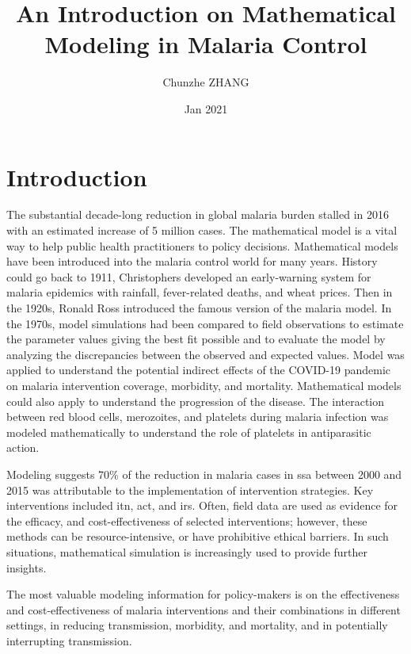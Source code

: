 \documentclass[a4paper, 12pt, twoside]{article}
\title{An Introduction on Mathematical Modeling in Malaria Control}
\author{Chunzhe ZHANG}
\date{Jan 2021}
\begin{document}
\begin{titlepage}
	\maketitle
\end{titlepage}

\tableofcontents

\section{Introduction}
The substantial decade-long reduction in global malaria burden stalled in 2016 with an estimated increase of 5 million cases.
The mathematical model is a vital way to help public health practitioners to policy decisions.
Mathematical models have been introduced into the malaria control world for many years.
History could go back to 1911, Christophers\cite{christophers1911epidemic} developed an early-warning system for malaria epidemics with rainfall, fever-related deaths, and wheat prices.
Then in the 1920s, Ronald Ross introduced the famous version of the malaria model.
In the 1970s, model simulations had been compared to field observations to estimate the parameter values giving the best fit possible and to evaluate the model by analyzing the discrepancies between the observed and expected values\cite{dietz1974}.
Model\cite{Weiss2020e} was applied to understand the potential indirect effects of the COVID-19 pandemic on malaria intervention coverage, morbidity, and mortality.
Mathematical models could also apply to understand the progression of the disease.
The interaction between red blood cells, merozoites, and platelets during malaria infection was modeled mathematically\cite{Alves2021} to understand the role of platelets in antiparasitic action.

Modeling suggests 70\% of the reduction in malaria cases in \gls{ssa} between 2000 and 2015 was attributable to the implementation of intervention strategies.
Key interventions included \gls{itn}, \gls{act}, and \gls{irs}.
Often, field data are used as evidence for the efficacy, and cost-effectiveness of selected interventions; however, these methods can be resource-intensive, or have prohibitive ethical barriers.
In such situations, mathematical simulation is increasingly used to provide further insights.

The most valuable modeling information for policy-makers is on the effectiveness and cost-effectiveness of malaria interventions and their combinations in different settings, in reducing transmission, morbidity, and mortality, and in potentially interrupting transmission.
\end{document}
